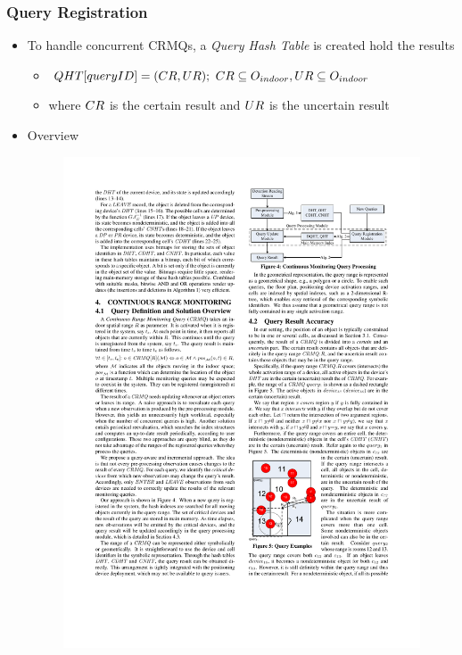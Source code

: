 \begin{frame}
\frametitle{Query Registration}

\begin{itemize}
  \item To handle concurrent \textrm{CRMQ}s, a \emph{Query Hash Table} is created hold the results
    \begin{itemize}
      \item $\mathnormal{QHT[queryID] = (CR, UR);~ CR \subseteq O_{indoor}, UR \subseteq O_{indoor}}$
      \item where $\mathnormal{CR}$ is the certain result and $\mathnormal{UR}$ is the uncertain result
    \end{itemize}
  \item Overview
    \begin{figure}[tb]
      \includegraphics[width=0.68\columnwidth]{figures/2-2/2-2-6.pdf}
    \end{figure}
\end{itemize}

\end{frame}


